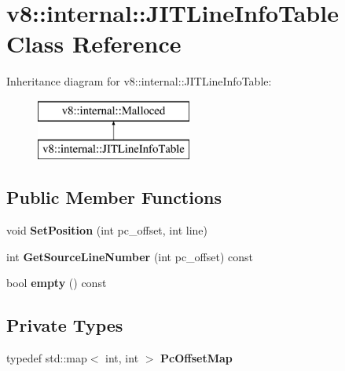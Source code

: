 \hypertarget{classv8_1_1internal_1_1_j_i_t_line_info_table}{}\section{v8\+:\+:internal\+:\+:J\+I\+T\+Line\+Info\+Table Class Reference}
\label{classv8_1_1internal_1_1_j_i_t_line_info_table}
Inheritance diagram for v8\+:\+:internal\+:\+:J\+I\+T\+Line\+Info\+Table\+:\begin{figure}[H]
\begin{center}
\leavevmode
\includegraphics[height=2.000000cm]{classv8_1_1internal_1_1_j_i_t_line_info_table}
\end{center}
\end{figure}
\subsection*{Public Member Functions}
\begin{DoxyCompactItemize}
\item 
void {\bfseries Set\+Position} (int pc\+\_\+offset, int line)\hypertarget{classv8_1_1internal_1_1_j_i_t_line_info_table_aa369f25d6d6455712aa4dbe1b079bdff}{}\label{classv8_1_1internal_1_1_j_i_t_line_info_table_aa369f25d6d6455712aa4dbe1b079bdff}

\item 
int {\bfseries Get\+Source\+Line\+Number} (int pc\+\_\+offset) const \hypertarget{classv8_1_1internal_1_1_j_i_t_line_info_table_a710408739f7334fe942b5632788dc79d}{}\label{classv8_1_1internal_1_1_j_i_t_line_info_table_a710408739f7334fe942b5632788dc79d}

\item 
bool {\bfseries empty} () const \hypertarget{classv8_1_1internal_1_1_j_i_t_line_info_table_ad075dcd06847502ce4c28e8b6fd542ba}{}\label{classv8_1_1internal_1_1_j_i_t_line_info_table_ad075dcd06847502ce4c28e8b6fd542ba}

\end{DoxyCompactItemize}
\subsection*{Private Types}
\begin{DoxyCompactItemize}
\item 
typedef std\+::map$<$ int, int $>$ {\bfseries Pc\+Offset\+Map}\hypertarget{classv8_1_1internal_1_1_j_i_t_line_info_table_afb47436fbe66678ce9cc6d18f2cc6373}{}\label{classv8_1_1internal_1_1_j_i_t_line_info_table_afb47436fbe66678ce9cc6d18f2cc6373}

\end{DoxyCompactItemize}
